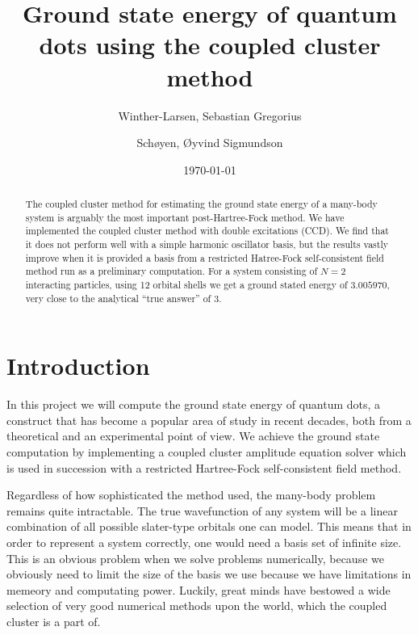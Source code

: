 \documentclass[
    a4paper, aps, twocolumn, floatfix, superscriptaddress,
    nofootinbib]{revtex4-1}
\newcommand{\1}{\mathds{1}}
\begin{document}
\title{Ground state energy of quantum dots using the coupled cluster method}
\author{Winther-Larsen, Sebastian Gregorius}
\author{Schøyen, Øyvind Sigmundson}
\date{\today}

\begin{abstract}
    The coupled cluster method for estimating the ground state energy of a
    many-body system is arguably the most important post-Hartree-Fock method. We
    have implemented the coupled cluster method with double excitations (CCD).
    We find that it does not perform well with a simple harmonic oscillator
    basis, but the results vastly improve when it is provided a basis from a
    restricted Hatree-Fock self-consistent field method run as a preliminary
    computation. For a system consisting of $N=2$ interacting particles, using
    12 orbital shells we get a ground stated energy of $3.005970$, very close to
    the analytical ``true answer'' of $3$\cite{taut1994two}.
\end{abstract}

\maketitle
\tableofcontents


\section{Introduction}
    In this project we will compute the ground state energy of quantum dots, a
    construct that has become a popular area of study in recent decades, both
    from a theoretical and an experimental point of view. We achieve the ground
    state computation by implementing a coupled cluster amplitude equation
    solver which is used in succession with a restricted Hartree-Fock
    self-consistent field method.

    Regardless of how sophisticated the method used, the many-body problem
    remains quite intractable. The true wavefunction of any system will be a
    linear combination of all possible slater-type orbitals one can model. This
    means that in order to represent a system correctly, one would need a basis
    set of infinite size. This is an obvious problem when we solve problems
    numerically, because we obviously need to limit the size of the basis we use
    because we have limitations in memeory and computating power. Luckily, great
    minds have bestowed a wide selection of very good numerical methods upon the
    world, which the coupled cluster is a part of.
\end{document}

